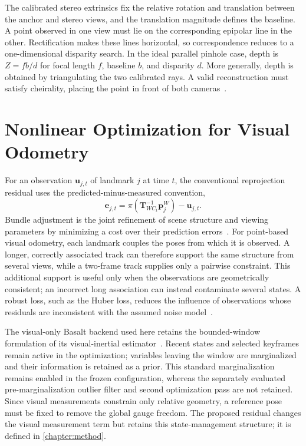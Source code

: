 The calibrated stereo extrinsics fix the relative rotation and translation between the anchor and stereo views, and the translation magnitude defines the baseline. A point observed in one view must lie on the corresponding epipolar line in the other. Rectification makes these lines horizontal, so correspondence reduces to a one-dimensional disparity search. In the ideal parallel pinhole case, depth is $Z=f b/d$ for focal length $f$, baseline $b$, and disparity $d$. More generally, depth is obtained by triangulating the two calibrated rays. A valid reconstruction must satisfy cheirality, placing the point in front of both cameras~\cite{hartley2004multiple}.

\section{Nonlinear Optimization for Visual Odometry}

For an observation $\mathbf{u}_{j,t}$ of landmark $j$ at time $t$, the conventional reprojection residual uses the predicted-minus-measured convention,
\begin{equation}
  \mathbf{e}_{j,t}
  = \pi\!\left(\mathbf{T}_{WC_t}^{-1}\mathbf{p}_j^W\right)
  - \mathbf{u}_{j,t}.
\end{equation}
Bundle adjustment is the joint refinement of scene structure and viewing parameters by minimizing a cost over their prediction errors~\cite{triggs2000bundle}. For point-based visual odometry, each landmark couples the poses from which it is observed. A longer, correctly associated track can therefore support the same structure from several views, while a two-frame track supplies only a pairwise constraint. This additional support is useful only when the observations are geometrically consistent; an incorrect long association can instead contaminate several states. A robust loss, such as the Huber loss, reduces the influence of observations whose residuals are inconsistent with the assumed noise model~\cite{huber1964robust}.

The visual-only Basalt backend used here retains the bounded-window formulation of its visual-inertial estimator~\cite{usenko2020visual}. Recent states and selected keyframes remain active in the optimization; variables leaving the window are marginalized and their information is retained as a prior. This standard marginalization remains enabled in the frozen configuration, whereas the separately evaluated pre-marginalization outlier filter and second optimization pass are not retained. Since visual measurements constrain only relative geometry, a reference pose must be fixed to remove the global gauge freedom. The proposed residual changes the visual measurement term but retains this state-management structure; it is defined in \autoref{chapter:method}.


